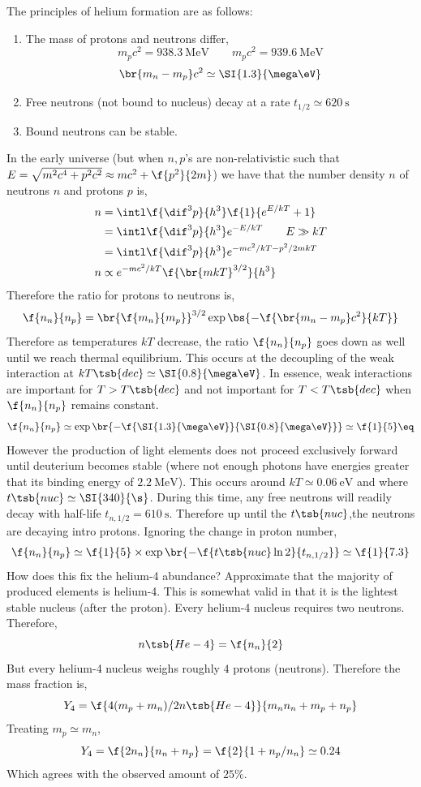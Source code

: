 \documentclass{article}
\begin{document}
The principles of helium formation are as follows:
\begin{enumerate}
    \item The mass of protons and neutrons differ,
    \[ m_p c^2 = \SI{938.3}{\mega \eV} \qquad m_p c^2 = \SI{939.6}{\mega \eV} \]
    \[ \br{m_n - m_p} c^2 \simeq \SI{1.3}{\mega \eV} \]
    \item Free neutrons (not bound to nucleus) decay at a rate $t_{1/2} \simeq \SI{620}{\s}$
    \item Bound neutrons can be stable.
\end{enumerate}
In the early universe (but when $n,p$'s are non-relativistic such that $E = \sqrt{m^2 c^4 + p^2 c^2} \approx m c^2 + \f{p^2}{2m}$) we have that the number density $n$ of neutrons $n$ and protons $p$ is,
\begin{align*}
    n
    &= \intl \f{\dif^3 p}{h^3} \f{1}{e^{E/kT} + 1} \\
    &= \intl \f{\dif^3 p}{h^3} e^{-E/kT} \qquad E \gg k T \\
    &= \intl \f{\dif^3 p}{h^3} e^{-mc^2/kT - p^2/2mkT} \\
    n &\propto e^{-mc^2/kT} \f{\br{mkT}^{3/2}}{h^3}
\end{align*}
Therefore the ratio for protons to neutrons is,
\[ \f{n_n}{n_p} = \br{\f{m_n}{m_p}}^{3/2} \exp\bs{- \f{\br{m_n - m_p}c^2}{k T}} \]
Therefore as temperatures $kT$ decrease, the ratio $\f{n_n}{n_p}$ goes down as well until we reach thermal equilibrium. This occurs at the decoupling of the weak interaction at $k T\tsb{dec} \simeq \SI{0.8}{\mega \eV}$. In essence, weak interactions are important for $T > T\tsb{dec}$ and not important for $T < T\tsb{dec}$ when $\f{n_n}{n_p}$ remains constant.
\[ \f{n_n}{n_p} \simeq \exp\br{-\f{\SI{1.3}{\mega\eV}}{\SI{0.8}{\mega\eV}}}\simeq \f{1}{5} \eq \label{eq:np}\]
However the production of light elements does not proceed exclusively forward until deuterium becomes stable (where not enough photons have energies greater that its binding energy of $\SI{2.2}{\mega \eV}$). This occurs around $kT \simeq \SI{0.06}{\eV}$ and where $t\tsb{nuc} \simeq \SI{340}{\s}$. During this time, any free neutrons will readily decay with half-life $t_{n,1/2}= \SI{610}{\s}$. Therefore up until the $t\tsb{nuc}$,the neutrons are decaying intro protons. Ignoring the change in proton number,
\[ \f{n_n}{n_p} \simeq \f{1}{5} \times \exp\br{- \f{t\tsb{nuc}\ln 2}{t_{n,1/2}}} \simeq \f{1}{7.3}  \]
How does this fix the helium-4 abundance? Approximate that the majority of produced elements is helium-4. This is somewhat valid in that it is the lightest stable nucleus (after the proton). Every helium-4 nucleus requires two neutrons. Therefore,
\[ n\tsb{He-4} = \f{n_n}{2}\]
But every helium-4 nucleus weighs roughly $4$ protons (neutrons). Therefore the mass fraction is,
\[ Y_4 = \f{4 (m_p + m_n)/2 n\tsb{He-4}}{m_n n_n + m_p + n_p} \]
Treating $m_p \simeq m_n$,
\[ Y_4 = \f{2 n_n}{n_n +n_p} = \f{2}{1 + n_p / n_n} \simeq 0.24 \]
Which agrees with the observed amount of $25 \%$.
\end{document}
